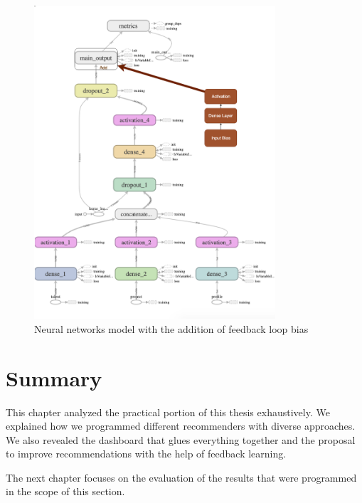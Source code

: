  \begin{figure}[!ht]
	\centering
	\includegraphics[width=0.8\textwidth]{figures/TensorBoardFeedback.png}
	\caption{Neural networks model with the addition of feedback loop bias}
	\label{fig:tensorboard-feedback}
\end{figure}



\section{Summary}

This chapter analyzed the practical portion of this thesis exhaustively. We explained how we programmed different recommenders with diverse approaches. We also revealed the dashboard that glues everything together and the proposal to improve recommendations with the help of feedback learning. 

The next chapter focuses on the evaluation of the results that were programmed in the scope of this section.

